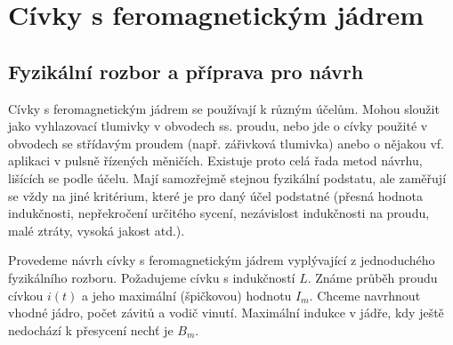 {  \section{Cívky s feromagnetickým jádrem}
    \subsection{Fyzikální rozbor a příprava pro návrh}\label{ES:ssec_01}
      Cívky s feromagnetickým jádrem se používají k různým účelům. Mohou sloužit jako vyhlazovací
      tlumivky v obvodech ss. proudu, nebo jde o cívky použité v obvodech se střídavým proudem 
      (např. zářivková tlumivka) anebo o nějakou vf. aplikaci v pulsně řízených měničích. Existuje 
      proto celá řada metod návrhu, lišících se podle účelu. Mají samozřejmě stejnou fyzikální 
      podstatu, ale zaměřují se vždy na jiné kritérium, které je pro daný účel podstatné (přesná 
      hodnota indukčnosti, nepřekročení určitého sycení, nezávislost indukčnosti na proudu, malé 
      ztráty, vysoká jakost atd.).
      
      Provedeme návrh cívky s feromagnetickým jádrem vyplývající z jednoduchého fyzikálního rozboru.
      Požadujeme cívku s indukčností \(L\). Známe průběh proudu cívkou \(i(t)\) a jeho maximální 
      (špičkovou) hodnotu \(I_m\). Chceme navrhnout vhodné jádro, počet závitů a vodič vinutí. 
      Maximální indukce v jádře, kdy ještě nedochází k přesycení nechť je \(B_m\).
      
}
